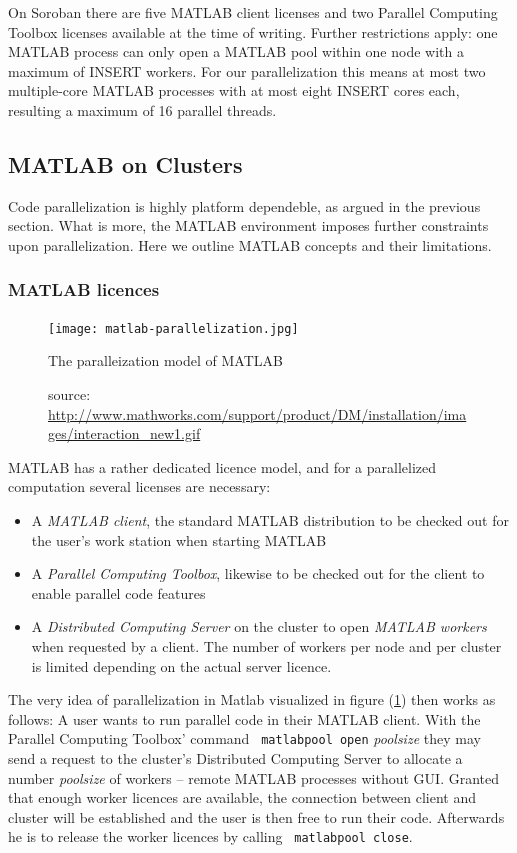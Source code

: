 \documentclass[11.5pt,a4paper]{article}
\begin{document}
On Soroban there are five MATLAB client licenses and two Parallel Computing Toolbox licenses available at the time of writing. Further restrictions apply: one MATLAB process can only open a MATLAB pool within one node with a maximum of INSERT workers. For our parallelization this means at most two multiple-core MATLAB processes with at most eight INSERT cores each, resulting a maximum of 16 parallel threads. 

\subsection{MATLAB on Clusters}
Code parallelization is highly platform dependeble, as argued in the previous section. What is more, the MATLAB environment imposes further constraints upon parallelization. Here we outline MATLAB concepts and their limitations.

\subsubsection{MATLAB licences}
\begin{figure}
  \centering
 \texttt{[image: matlab-parallelization.jpg]}
  \caption{The paralleization model of MATLAB}
  \label{fig-matlab-parallelization}
  \caption*{source:  \url{http://www.mathworks.com/support/product/DM/installation/images/interaction_new1.gif}}
\end{figure}
MATLAB has a rather dedicated licence model, and for a parallelized computation several licenses are necessary:
\begin{itemize}
 \item A \emph{MATLAB client}, the standard MATLAB distribution to be checked out for the user's work station when starting MATLAB
\item A \emph{Parallel Computing Toolbox}, likewise to be checked out for the client to enable parallel code features
\item A \emph{Distributed Computing Server} on the cluster to open \emph{MATLAB workers} when requested by a client. The number of workers per node and per cluster is limited depending on the actual server licence.
\end{itemize}
The very idea of parallelization in Matlab visualized in figure (\ref{fig-matlab-parallelization}) then works as follows: A user wants to run parallel code in their MATLAB client. With the Parallel Computing Toolbox' command \verb$ matlabpool open$ \emph{poolsize} they may send a request to the cluster's Distributed Computing Server to allocate a number \emph{poolsize} of workers -- remote MATLAB processes without GUI. Granted that enough worker licences are available, the connection between client and cluster will be established and the user is then free to run their code. Afterwards he is to release the worker licences by calling \verb$ matlabpool close$.
\end{document}
